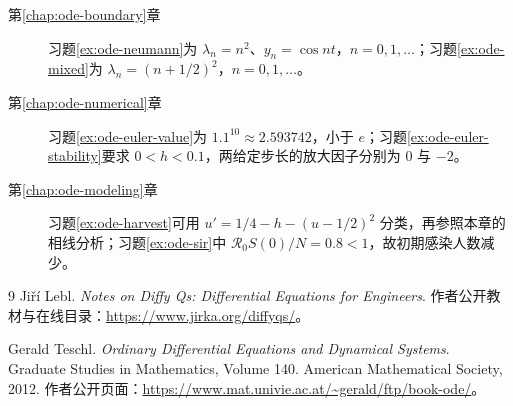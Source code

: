 \documentclass[UTF8,12pt,a4paper,fontset=fandol]{ctexbook}
\begin{document}
\begin{description}
 \item[第\ref{chap:ode-boundary}章] 习题\ref{ex:ode-neumann}为 $\lambda_n=n^2$、$y_n=\cos nt$，$n=0,1,\ldots$；习题\ref{ex:ode-mixed}为 $\lambda_n=(n+1/2)^2$，$n=0,1,\ldots$。
 \item[第\ref{chap:ode-numerical}章] 习题\ref{ex:ode-euler-value}为 $1.1^{10}\approx2.593742$，小于 $e$；习题\ref{ex:ode-euler-stability}要求 $0<h<0.1$，两给定步长的放大因子分别为 $0$ 与 $-2$。
 \item[第\ref{chap:ode-modeling}章] 习题\ref{ex:ode-harvest}可用 $u'=1/4-h-(u-1/2)^2$ 分类，再参照本章的相线分析；习题\ref{ex:ode-sir}中 $\mathcal R_0S(0)/N=0.8<1$，故初期感染人数减少。
\end{description}

\backmatter

\begin{thebibliography}{9}
  Jiří Lebl.
  \emph{Notes on Diffy Qs: Differential Equations for Engineers}.
  作者公开教材与在线目录：\url{https://www.jirka.org/diffyqs/}。

  Gerald Teschl.
  \emph{Ordinary Differential Equations and Dynamical Systems}.
  Graduate Studies in Mathematics, Volume 140.
  American Mathematical Society, 2012.
  作者公开页面：\url{https://www.mat.univie.ac.at/~gerald/ftp/book-ode/}。
\end{thebibliography}
\end{document}
